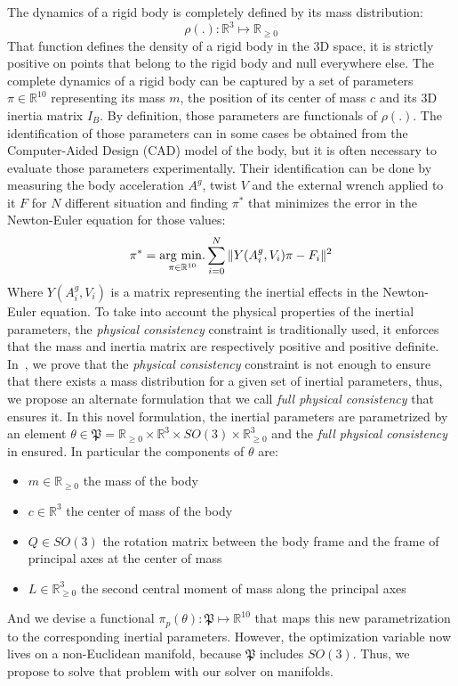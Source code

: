 The dynamics of a rigid body is completely defined by its mass distribution:
\begin{equation}
  \rho(.):\mathbb{R}^3 \mapsto\mathbb{R}_{\geq 0}
\end{equation}
That function defines the density of a rigid body in the 3D space, it is strictly positive on points that belong to the rigid body and null everywhere else.
The complete dynamics of a rigid body can be captured by a set of parameters $\pi\in\mathbb{R}^{10}$ representing its mass $m$, the position of its center of mass $c$ and its 3D inertia matrix $I_B$.
By definition, those parameters are functionals of $\rho(.)$.
The identification of those parameters can in some cases be obtained from the Computer-Aided Design (CAD) model of the body, but it is often necessary to evaluate those parameters experimentally.
Their identification can be done by measuring the body acceleration $A^g$, twist $V$ and the external wrench applied to it $F$ for $N$ different situation and finding $\pi^*$ that minimizes the error in the Newton-Euler equation for those values:
\begin{equation}
\label{eq:classicIdentif}
  \pi^* = \operatorname*{arg\ min.}_{\pi\in\mathbb{R}^{10}} \sum_{i=0}^N \|Y(A^g_i,V_i)\pi -F_i\|^2
\end{equation}
Where $Y(A^g_i,V_i)$ is a matrix representing the inertial effects in the Newton-Euler equation.
To take into account the physical properties of the inertial parameters, the \emph{physical consistency} constraint is traditionally used, it enforces that the mass and inertia matrix are respectively positive and positive definite.
In~\cite{traversaro:iros:2016}, we prove that the \emph{physical consistency} constraint is not enough to ensure that there exists a mass distribution for a given set of inertial parameters, thus, we propose an alternate formulation that we call \emph{full physical consistency} that ensures it.
In this novel formulation, the inertial parameters are parametrized by an element $\theta \in \mathfrak{P} = \mathbb{R}_{\ge 0} \times \mathbb{R}^3 \times  SO(3) \times \mathbb{R}_{\ge 0}^3$ and the \emph{full physical consistency} in ensured.
In particular the components of $\theta$ are:
\begin{itemize}
    \item $m \in \mathbb{R}_{\ge 0}$ the mass of the body
    \item $c \in \mathbb{R}^3$ the center of mass of the body
    \item $Q \in SO(3)$ the rotation matrix between the body frame and the frame of principal axes at the center of mass
    \item $L \in \mathbb{R}_{\ge 0}^3$ the second central moment of mass along the principal axes
\end{itemize}
And we devise a functional $\pi_p(\theta):\mathfrak{P}\mapsto\mathbb{R}^{10}$ that maps this new parametrization to the corresponding inertial parameters.
However, the optimization variable now lives on a non-Euclidean manifold, because $\mathfrak{P}$ includes $SO(3)$.
Thus, we propose to solve that problem with our solver on manifolds.

